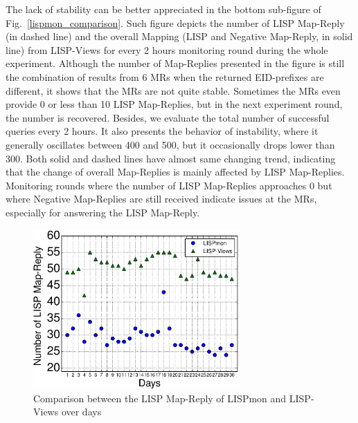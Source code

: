 The lack of stability can be better appreciated in the bottom sub-figure of Fig.~\ref{lispmon_comparison}. Such figure depicts the number of LISP Map-Reply (in dashed line) and the overall Mapping (LISP and Negative Map-Reply, in solid line) from LISP-Views for every 2 hours monitoring round during the whole experiment. Although the number of Map-Replies presented in the figure is still the combination of results from 6 MRs when the returned EID-prefixes are different, it shows that the MRs are not quite stable. Sometimes the MRs even provide 0 or less than 10 LISP Map-Replies, but in the next experiment round, the number is recovered. Besides, we evaluate the total number of successful queries every 2 hours. It also presents the behavior of instability, where it generally oscillates between 400 and 500, but it occasionally drops lower than 300. Both solid and dashed lines have almost same changing trend, indicating that the change of overall Map-Replies is mainly affected by LISP Map-Replies. Monitoring rounds where the number of LISP Map-Replies approaches 0 but where  Negative Map-Replies are still received indicate issues at the MRs, especially for answering the LISP Map-Reply.

\begin{figure}[!t]
        \centering
        \includegraphics[width=0.7\textwidth]{Pics/LISPmon_comparison_day.eps}
        \caption{Comparison between the LISP Map-Reply of LISPmon and LISP-Views over days}
        \label{lispmon_comparison_day}
\end{figure}


